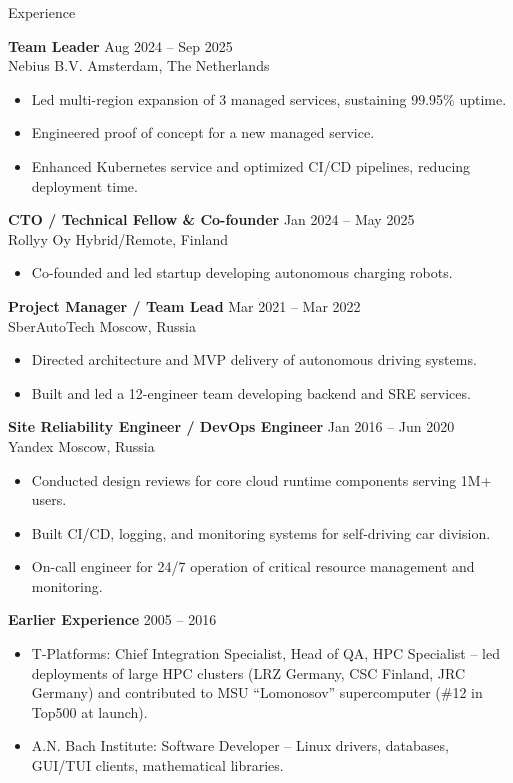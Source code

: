 \documentclass{resume} %
\begin{document}
\begin{rSection}{Experience}

\textbf{Team Leader} \hfill Aug 2024 -- Sep 2025 \\
Nebius B.V. \hfill Amsterdam, The Netherlands
\begin{itemize}
  \item Led multi-region expansion of 3 managed services, sustaining 99.95\% uptime.
  \item Engineered proof of concept for a new managed service.
  \item Enhanced Kubernetes service and optimized CI/CD pipelines, reducing deployment time.
\end{itemize}

\textbf{CTO / Technical Fellow \& Co-founder} \hfill Jan 2024 -- May 2025 \\
Rollyy Oy \hfill Hybrid/Remote, Finland
\begin{itemize}
  \item Co-founded and led startup developing autonomous charging robots.
\end{itemize}

\textbf{Project Manager / Team Lead} \hfill Mar 2021 -- Mar 2022 \\
SberAutoTech \hfill Moscow, Russia
\begin{itemize}
  \item Directed architecture and MVP delivery of autonomous driving systems.
  \item Built and led a 12-engineer team developing backend and SRE services.
\end{itemize}

\textbf{Site Reliability Engineer / DevOps Engineer} \hfill Jan 2016 -- Jun 2020 \\
Yandex \hfill Moscow, Russia
\begin{itemize}
  \item Conducted design reviews for core cloud runtime components serving 1M+ users.
  \item Built CI/CD, logging, and monitoring systems for self-driving car division.
  \item On-call engineer for 24/7 operation of critical resource management and monitoring.
\end{itemize}

\textbf{Earlier Experience} \hfill 2005 -- 2016
\begin{itemize}
  \item T-Platforms: Chief Integration Specialist, Head of QA, HPC Specialist – led deployments of large HPC clusters (LRZ Germany, CSC Finland, JRC Germany) and contributed to MSU “Lomonosov” supercomputer (\#12 in Top500 at launch).
  \item A.N. Bach Institute: Software Developer – Linux drivers, databases, GUI/TUI clients, mathematical libraries.
\end{itemize}

\end{rSection}
\end{document}
